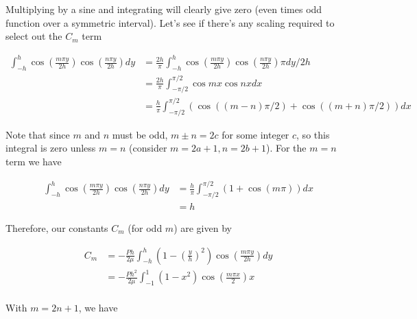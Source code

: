 %
%
%

Multiplying by a sine and integrating will clearly give zero (even times odd function over a symmetric interval).  Let's see if there's any scaling required to select out the $C_m$ term

\begin{align*}
\int_{-h}^h 
\cos \left( \frac{ m \pi y }{2 h} \right) 
\cos \left( \frac{ n \pi y }{2 h} \right) dy
&=
\frac{2h}{\pi} \int_{-h}^h 
\cos \left( \frac{ m \pi y }{2 h} \right) 
\cos \left( \frac{ n \pi y }{2 h} \right) \pi dy/2h \\
&=
\frac{2h}{\pi} \int_{-\pi/2}^{\pi/2}
\cos m x \cos n x dx \\
&=
\frac{h}{\pi} \int_{-\pi/2}^{\pi/2}
\left( 
\cos( (m - n) \pi/2 ) 
+\cos( (m + n) \pi/2 ) 
\right) dx
\end{align*}

Note that since $m$ and $n$ must be odd, $m \pm n = 2 c$ for some integer $c$, so this integral is zero unless $m = n$ (consider $m = 2 a + 1, n = 2 b + 1$).  For the $m = n$ term we have

\begin{align*}
\int_{-h}^h 
\cos \left( \frac{ m \pi y }{2 h} \right) 
\cos \left( \frac{ n \pi y }{2 h} \right) dy
&=
\frac{h}{\pi} \int_{-\pi/2}^{\pi/2}
\left( 
1
+\cos( m \pi ) 
\right) dx \\
&=
h
\end{align*}

Therefore, our constants $C_m$ (for odd $m$) are given by

\begin{align*}
C_m 
&= 
-\frac{P h }{2 \mu} 
\int_{-h}^h
\left( 1 - \left( \frac{y}{h}\right)^2 \right)
\cos \left( \frac{ m \pi y }{2 h} \right) dy \\
&=
-\frac{P h^2 }{2 \mu} 
\int_{-1}^1
\left( 1 - x^2 \right)
\cos \left( \frac{ m \pi x }{2} \right) x  \\
\end{align*}

With $m = 2 n + 1$, we have

